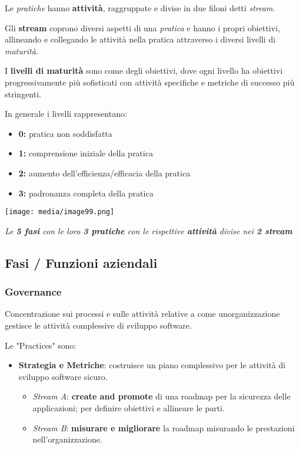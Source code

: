 Le \emph{pratiche} hanno \textbf{attività}, raggruppate e divise in due
filoni detti \emph{stream}.

Gli \textbf{stream} coprono diversi aspetti di una \emph{pratica} e
hanno i propri obiettivi, allineando e collegando le attività nella
pratica attraverso i diversi livelli di \emph{maturità}.

I \textbf{livelli di maturità} sono come degli obiettivi, dove ogni
livello ha obiettivi progressivamente più sofisticati con attività
specifiche e metriche di successo più stringenti.

In generale i livelli rappresentano:

\begin{itemize}
\item
  \textbf{0:} pratica non soddisfatta
\item
  \textbf{1:} comprensione iniziale della pratica
\item
  \textbf{2:} aumento dell'efficienza/efficacia della pratica
\item
  \textbf{3:} padronanza completa della pratica
\end{itemize}

\texttt{[image: media/image99.png]}

\emph{Le \textbf{5 fasi} con le loro \textbf{3 pratiche} con le
rispettive \textbf{attività} divise nei \textbf{2 stream}}

\subsection{Fasi / Funzioni aziendali}\label{fasi-funzioni-aziendali}

\subsubsection{Governance}\label{governance}

Concentrazione sui processi e sulle attività relative a come
un\textquotesingle organizzazione gestisce le attività complessive di
sviluppo software.

Le "Practices" sono:

\begin{itemize}
\item
  \textbf{Strategia e Metriche}: costruisce un piano complessivo per le
  attività di sviluppo software sicuro.

  \begin{itemize}
  \item
    \emph{Stream A}: \textbf{create and promote} di una roadmap per la
    sicurezza delle applicazioni; per definire obiettivi e allineare le
    parti.
  \item
    \emph{Stream B}: \textbf{misurare e migliorare} la roadmap misurando
    le prestazioni nell'organizzazione.
  \end{itemize}
\end{itemize}

